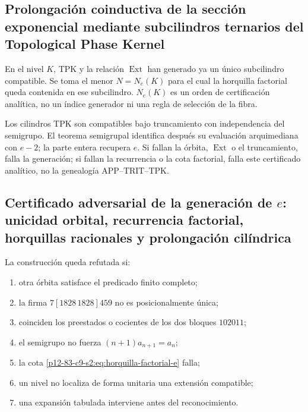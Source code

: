 \subsection{Prolongación coinductiva de la sección exponencial mediante subcilindros ternarios del Topological Phase Kernel}

En el nivel \(K\), TPK y la relación \(\operatorname{Ext}\) han generado ya
un único subcilindro compatible. Se toma el menor \(N=N_e(K)\) para el cual
la horquilla factorial queda contenida en ese subcilindro. \(N_e(K)\) es un
orden de certificación analítica, no un índice generador ni una regla de
selección de la fibra.

Los cilindros TPK son compatibles bajo truncamiento con independencia del
semigrupo. El teorema semigrupal identifica después su evaluación
arquimediana con \(e-2\); la parte entera recupera \(e\). Si fallan la órbita,
\(\operatorname{Ext}\) o el truncamiento, falla la generación; si fallan la
recurrencia o la cota factorial, falla este certificado analítico, no la
genealogía APP--TRIT--TPK.

\subsection{Certificado adversarial de la generación de \(e\): unicidad orbital, recurrencia factorial, horquillas racionales y prolongación cilíndrica}

\begin{criterion}
La construcción queda refutada si:
\begin{enumerate}
 \item otra órbita satisface el predicado finito completo;
 \item la firma \(7[1828\,1828]459\) no es posicionalmente única;
 \item coinciden los preestados o cocientes de los dos bloques \(102011\);
 \item el semigrupo no fuerza \((n+1)a_{n+1}=a_n\);
 \item la cota \eqref{p12-83-c9-s2:eq:horquilla-factorial-e} falla;
 \item un nivel no localiza de forma unitaria una extensión compatible;
 \item una expansión tabulada interviene antes del reconocimiento.
\end{enumerate}
\end{criterion}



